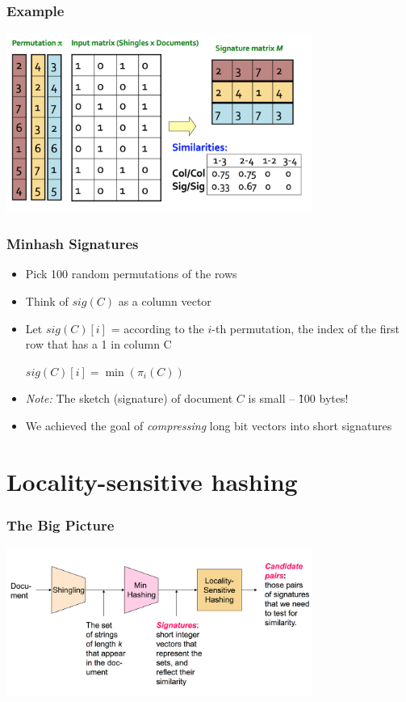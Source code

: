 \documentclass[svgnames]{beamer}
\begin{document}
  
\begin{frame} \frametitle{Example}
\includegraphics[width=10cm]{example}
\end{frame}

  
\begin{frame} \frametitle{Minhash Signatures}

\begin{itemize}
\item Pick 100 random permutations of the rows
\item Think of $sig(C)$ as a column vector
\item Let $sig(C)[i]$ = according to the $i$-th permutation, the index of the first row that has a 1 in column C

\begin{center}   
$sig(C)[i] = \min (\pi_i(C))$
\end{center}

\item \emph{Note:} The sketch (signature) of document $C$ is small -- \~100 bytes!

\item We achieved the goal of \emph{compressing} long bit vectors into short signatures
\end{itemize}
\end{frame}

  
\section{Locality-sensitive hashing}

  
\begin{frame} \frametitle{The Big Picture}
\includegraphics[width=10cm]{overall}
\end{frame}
\end{document}
